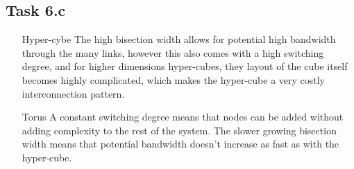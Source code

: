 \subsection{Task 6.c}
\begin{itemize}
    \item[Hyper-cybe] The high bisection width allows for potential high
    bandwidth through the many links, however this also comes with a high
    switching degree, and for higher dimensions hyper-cubes, they layout of the
    cube itself becomes highly complicated, which makes the hyper-cube a very
    costly interconnection pattern.

    \item[Torus] A constant switching degree means that nodes can be added
    without adding complexity to the rest of the system. The slower growing
    bisection width means that potential bandwidth doesn't increase as fast as
    with the hyper-cube.
\end{itemize}
